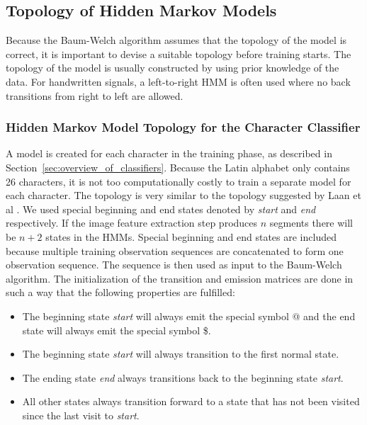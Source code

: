 
\subsection{Topology of Hidden Markov Models}

Because the Baum-Welch algorithm assumes that the topology of the model is correct, it is important to devise a suitable topology before training starts. 
The topology of the model is usually constructed by using prior knowledge of the data. 
For handwritten signals, a left-to-right HMM is often used where no back transitions from right to left are allowed. \cite{Suen}

\subsubsection{Hidden Markov Model Topology for the Character Classifier}

A model is created for each character in the training phase, as described in Section~\ref{sec:overview_of_classifiers}.
Because the Latin alphabet only contains 26 characters, it is not too computationally costly to train a separate model for each character.
The topology is very similar to the topology suggested by Laan et al \cite{Laan}. 
We used special beginning and end states denoted by \textit{start} and \textit{end} respectively.
If the image feature extraction step produces $n$ segments there will be $n + 2$ states in the HMMs.
Special beginning and end states are included because multiple training observation sequences are concatenated to form one observation sequence.
The sequence is then used as input to the Baum-Welch algorithm.
The initialization of the transition and emission matrices are done in such a way that the following properties are fulfilled:

\begin{itemize}
 \item The beginning state \textit{start} will always emit the special symbol @ and the end state will always emit the special symbol \$.
 \item The  beginning state \textit{start} will always transition to the first normal state.
 \item The ending state \textit{end} always transitions back to the beginning state \textit{start}.
 \item All other states always transition forward to a state that has not been visited since the last visit to \textit{start}.
\end{itemize}



